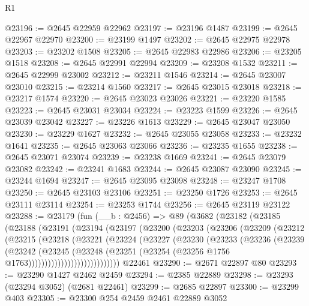 \begin{lexlean}{R1}
\begin{coremodule}
@23196 := @2645 @22959 @22962
@23197 := @23196 @1487
@23199 := @2645 @22967 @22970
@23200 := @23199 @1497
@23202 := @2645 @22975 @22978
@23203 := @23202 @1508
@23205 := @2645 @22983 @22986
@23206 := @23205 @1518
@23208 := @2645 @22991 @22994
@23209 := @23208 @1532
@23211 := @2645 @22999 @23002
@23212 := @23211 @1546
@23214 := @2645 @23007 @23010
@23215 := @23214 @1560
@23217 := @2645 @23015 @23018
@23218 := @23217 @1574
@23220 := @2645 @23023 @23026
@23221 := @23220 @1585
@23223 := @2645 @23031 @23034
@23224 := @23223 @1599
@23226 := @2645 @23039 @23042
@23227 := @23226 @1613
@23229 := @2645 @23047 @23050
@23230 := @23229 @1627
@23232 := @2645 @23055 @23058
@23233 := @23232 @1641
@23235 := @2645 @23063 @23066
@23236 := @23235 @1655
@23238 := @2645 @23071 @23074
@23239 := @23238 @1669
@23241 := @2645 @23079 @23082
@23242 := @23241 @1683
@23244 := @2645 @23087 @23090
@23245 := @23244 @1694
@23247 := @2645 @23095 @23098
@23248 := @23247 @1708
@23250 := @2645 @23103 @23106
@23251 := @23250 @1726
@23253 := @2645 @23111 @23114
@23254 := @23253 @1744
@23256 := @2645 @23119 @23122
@23288 := @23179
    (fun (__b : @2456) =>
    @89
      (@3682
        (@23182
          (@23185
            (@23188
              (@23191
                (@23194
                  (@23197
                    (@23200
                      (@23203
                        (@23206
                          (@23209
                            (@23212
                              (@23215
                                (@23218
                                  (@23221
                                    (@23224
                                      (@23227
                                        (@23230
                                          (@23233
                                            (@23236
                                              (@23239
                                                (@23242
                                                  (@23245
                                                    (@23248
                                                      (@23251
                                                        (@23254
                                                          (@23256
                                                            @1756
                                                            @1763))))))))))))))))))))))))))))
    @22461
@23290 := @2671 @22897 @80
@23293 := @23290 @1427 @2462 @2459
@23294 := @2385 @22889
@23298 := @23293 (@23294 @3052) (@2681 @22461)
@23299 := @2685 @22897
@23300 := @23299 @403
@23305 := @23300 @254 @2459 @2461 @22889 @3052

\end{coremodule}
\end{lexlean}
